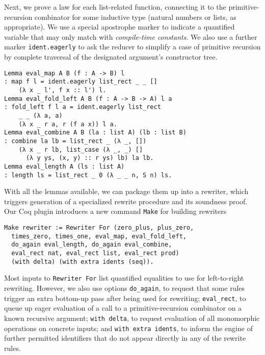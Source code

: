 \documentclass[sigplan,10pt,review,anonymous]{acmart}\settopmatter{printfolios=true,printccs=false,printacmref=false}
\newcommand{\todo}[1]{\textbf{TODO: #1}}
\begin{document}
Next, we prove a law for each list-related function, connecting it to the primitive-recursion combinator for some inductive type (natural numbers or lists, as appropriate).
We use a special apostrophe marker to indicate a quantified variable that may only match with \emph{compile-time constants}.
We also use a further marker \texttt{ident.eagerly} to ask the reducer to simplify a case of primitive recursion by complete traversal of the designated argument's constructor tree.
\begin{verbatim}
Lemma eval_map A B (f : A -> B) l
: map f l = ident.eagerly list_rect _ _ []
    (λ x _ l', f x :: l') l.
Lemma eval_fold_left A B (f : A -> B -> A) l a
: fold_left f l a = ident.eagerly list_rect
    _ _ (λ a, a)
    (λ x _ r a, r (f a x)) l a.
Lemma eval_combine A B (la : list A) (lb : list B)
: combine la lb = list_rect _ (λ _, [])
    (λ x _ r lb, list_case (λ _, _) []
      (λ y ys, (x, y) :: r ys) lb) la lb.
Lemma eval_length A (ls : list A)
: length ls = list_rect _ 0 (λ _ _ n, S n) ls.
\end{verbatim}

With all the lemmas available, we can package them up into a rewriter, which triggers generation of a specialized rewrite procedure and its soundness proof.
Our Coq plugin introduces a new command \texttt{Make} for building rewriters
\begin{verbatim}
Make rewriter := Rewriter For (zero_plus, plus_zero,
  times_zero, times_one, eval_map, eval_fold_left,
  do_again eval_length, do_again eval_combine,
  eval_rect nat, eval_rect list, eval_rect prod)
  (with delta) (with extra idents (seq)).
\end{verbatim}
Most inputs to \texttt{Rewriter For} list quantified equalities to use for left-to-right rewriting.
However, we also use options \texttt{do_again}, to request that some rules trigger an extra bottom-up pass after being used for rewriting; \texttt{eval_rect}, to queue up eager evaluation of a call to a primitive-recursion combinator on a known recursive argument; \texttt{with delta}, to request evaluation of all monomorphic operations on concrete inputs; and \texttt{with extra idents}, to inform the engine of further permitted identifiers that do not appear directly in any of the rewrite rules.
\end{document}
